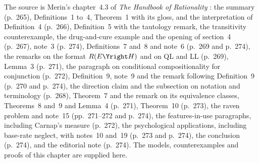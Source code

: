 The source is Merin's chapter~4.3 of \emph{The Handbook of Rationality}
\cite[pp.~265--275]{Merin2021Relevance}: the summary (p.~265),
Definitions~1 to~4, Theorem~1 with its gloss, and the interpretation of
Definition~4 (p.~266), Definition~5 with the tautology remark, the
transitivity counterexample, the drug-and-cure example and the opening of
section~4 (p.~267), note~3 (p.~274), Definitions~7 and~8 and note~6
(p.~269 and p.~274), the remarks on the format \(R(E\Yright H)\) and on
QL and LL (p.~269), Lemma~3 (p.~271), the paragraph on conditional
compositionality for conjunction (p.~272), Definition~9, note~9 and the remark following
Definition~9 (p.~270 and p.~274), the
direction claim and the subsection on notation and terminology
(p.~268), Theorem~7 and the remark on its equivalence classes,
Theorems~8 and~9 and Lemma~4 (p.~271), Theorem~10 (p.~273),
the raven problem and note~15 (pp.~271--272
and p.~274), the features-in-use paragraphs, including Carnap's measure
(p.~272), the psychological applications, including base-rate neglect,
with notes~10 and~19 (p.~273 and p.~274), the conclusion (p.~274), and
the editorial note (p.~274).
The models, counterexamples and proofs of this chapter are supplied
here.

